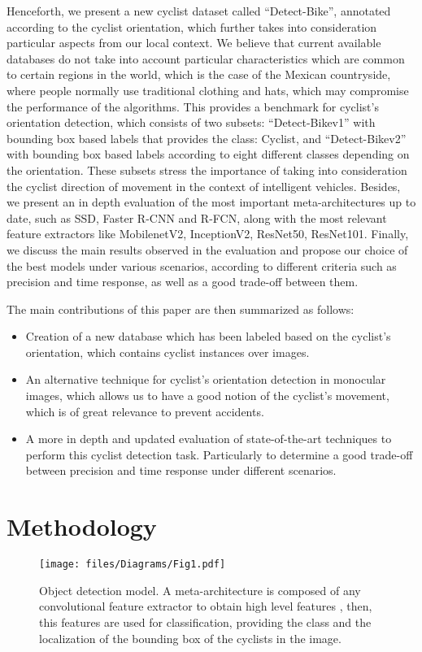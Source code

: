 \documentclass[journal]{IEEEtran}
\begin{document}
Henceforth, we present a new cyclist dataset called ``Detect-Bike'', annotated according to the cyclist orientation, which further takes into consideration particular aspects from our local context. We believe that current available databases do not take into account particular characteristics which are common to certain regions in the world, which is the case of the Mexican countryside, where people normally use traditional clothing and hats, which may compromise the performance of the algorithms. This provides a benchmark for cyclist's orientation detection, which consists of two subsets: ``Detect-Bikev1'' with bounding box based labels that provides the class: Cyclist, and ``Detect-Bikev2'' with bounding box based labels according to eight different classes depending on the orientation. These subsets stress the importance of taking into consideration the cyclist direction of movement in the context of intelligent vehicles. Besides, we present an in depth evaluation of the most important meta-architectures up to date, such as SSD, Faster R-CNN and R-FCN, along with the most relevant feature extractors like MobilenetV2, InceptionV2, ResNet50, ResNet101. Finally, we discuss the main results observed in the evaluation and propose our choice of the best models under various scenarios, according to different criteria such as precision and time response, as well as a good trade-off between them.

The main contributions of this paper are then summarized as follows:
\begin{itemize}
  \item Creation of a new database which has been labeled based on the cyclist's orientation, which contains  cyclist instances over  images. 
  \item An alternative technique for cyclist's orientation detection in monocular images, which allows us to have a good notion of the cyclist's movement,  which is of great relevance to prevent accidents.
  \item A more in depth and updated evaluation of state-of-the-art techniques to perform this cyclist detection task. Particularly to determine a good trade-off between precision and time response under different scenarios.
\end{itemize}

\section{Methodology}
\label{sec:methodology}
\begin{figure}[!t]
\centering\texttt{[image: files/Diagrams/Fig1.pdf]}
\caption{Object detection model. A meta-architecture is composed of any convolutional feature extractor to obtain high level features \cite{huang2017speed}, then, this features are used for classification, providing the class and the localization of the bounding box of the cyclists in the image.}
\label{fig:ObjectDetectionModel}
\end{figure}
\end{document}
